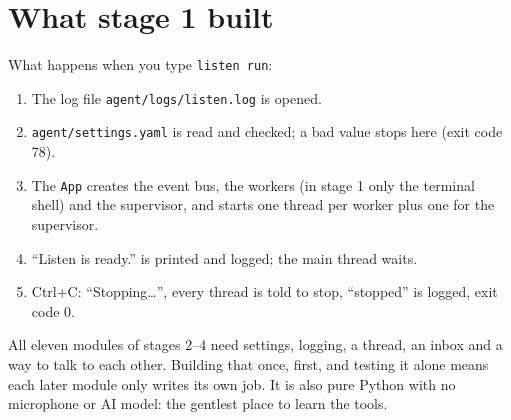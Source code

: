 \documentclass[11pt,a4paper]{article}
\begin{document}
\section{What stage 1 built}
\begin{center}
\end{center}

\noindent What happens when you type \texttt{listen run}:
\begin{enumerate}[nosep]
  \item The log file \texttt{agent/logs/listen.log} is opened.
  \item \texttt{agent/settings.yaml} is read and checked; a bad value stops here (exit code 78).
  \item The \texttt{App} creates the event bus, the workers (in stage 1 only the terminal shell)
        and the supervisor, and starts one thread per worker plus one for the supervisor.
  \item ``Listen is ready.'' is printed and logged; the main thread waits.
  \item Ctrl+C: ``Stopping\ldots'', every thread is told to stop, ``stopped'' is logged, exit code 0.
\end{enumerate}

\begin{why}
All eleven modules of stages 2--4 need settings, logging, a thread, an inbox and a way to talk to
each other. Building that once, first, and testing it alone means each later module only writes
its own job. It is also pure Python with no microphone or AI model: the gentlest place to learn
the tools.
\end{why}
\end{document}
